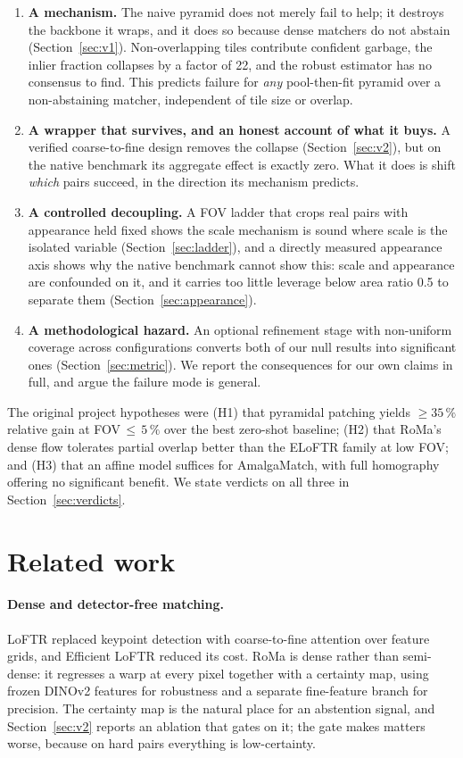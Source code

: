 \documentclass[10pt]{article}
\begin{document}
\begin{enumerate}
\item \textbf{A mechanism.} The naive pyramid does not merely fail to help; it destroys the backbone it wraps, and it does so because dense matchers do not abstain (Section~\ref{sec:v1}). Non-overlapping tiles contribute confident garbage, the inlier fraction collapses by a factor of 22, and the robust estimator has no consensus to find. This predicts failure for \emph{any} pool-then-fit pyramid over a non-abstaining matcher, independent of tile size or overlap.
\item \textbf{A wrapper that survives, and an honest account of what it buys.} A verified coarse-to-fine design removes the collapse (Section~\ref{sec:v2}), but on the native benchmark its aggregate effect is exactly zero. What it does is shift \emph{which} pairs succeed, in the direction its mechanism predicts.
\item \textbf{A controlled decoupling.} A FOV ladder that crops real pairs with appearance held fixed shows the scale mechanism is sound where scale is the isolated variable (Section~\ref{sec:ladder}), and a directly measured appearance axis shows why the native benchmark cannot show this: scale and appearance are confounded on it, and it carries too little leverage below area ratio 0.5 to separate them (Section~\ref{sec:appearance}).
\item \textbf{A methodological hazard.} An optional refinement stage with non-uniform coverage across configurations converts both of our null results into significant ones (Section~\ref{sec:metric}). We report the consequences for our own claims in full, and argue the failure mode is general.
\end{enumerate}

The original project hypotheses were (H1) that pyramidal patching yields ${\ge}35\,\%$ relative gain at FOV\,${\le}\,5\,\%$ over the best zero-shot baseline; (H2) that RoMa's dense flow tolerates partial overlap better than the ELoFTR family at low FOV; and (H3) that an affine model suffices for AmalgaMatch, with full homography offering no significant benefit. We state verdicts on all three in Section~\ref{sec:verdicts}.

\section{Related work}

\paragraph{Dense and detector-free matching.} LoFTR \citep{sun2021loftr} replaced keypoint detection with coarse-to-fine attention over feature grids, and Efficient LoFTR \citep{wang2024efficientloftr} reduced its cost. RoMa \citep{edstedt2024roma} is dense rather than semi-dense: it regresses a warp at every pixel together with a certainty map, using frozen DINOv2 features \citep{oquab2024dinov2} for robustness and a separate fine-feature branch for precision. The certainty map is the natural place for an abstention signal, and Section~\ref{sec:v2} reports an ablation that gates on it; the gate makes matters worse, because on hard pairs everything is low-certainty.
\end{document}
